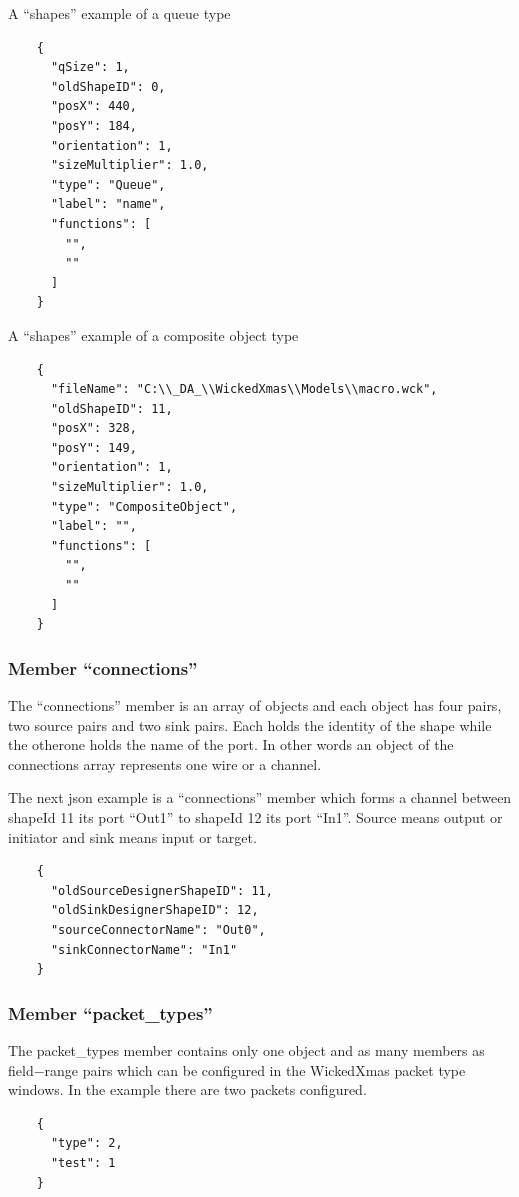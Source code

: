 \documentclass[a4paper,11pt,final]{article}
\begin{document}
\begin{samepage}
A ``shapes'' example of a queue type
\color{blue}
\begin{verbatim}
    {
      "qSize": 1,
      "oldShapeID": 0,
      "posX": 440,
      "posY": 184,
      "orientation": 1,
      "sizeMultiplier": 1.0,
      "type": "Queue",
      "label": "name",
      "functions": [
        "",
        ""
      ]
    }
\end{verbatim}
\color{black}
\end{samepage}

\begin{samepage}
A ``shapes'' example of a composite object type
\color{blue}
\begin{verbatim}
    {
      "fileName": "C:\\_DA_\\WickedXmas\\Models\\macro.wck",
      "oldShapeID": 11,
      "posX": 328,
      "posY": 149,
      "orientation": 1,
      "sizeMultiplier": 1.0,
      "type": "CompositeObject",
      "label": "",
      "functions": [
        "",
        ""
      ]
    }
\end{verbatim}
\color{black}
\end{samepage}

\begin{samepage}
\subsubsection{Member ``connections''}
The ``connections'' member is an array of objects and each object has four pairs, two
source pairs and two sink pairs. Each holds the identity of the shape while
the otherone holds the name of the port.
In other words an object of the connections array represents one wire or a channel.

The next json example is a ``connections'' member which forms a channel between shapeId 11 its port
``Out1'' to shapeId 12 its port ``In1''. Source means output or initiator and sink means
input or target.
\color{blue}
\begin{verbatim}
    {
      "oldSourceDesignerShapeID": 11,
      "oldSinkDesignerShapeID": 12,
      "sourceConnectorName": "Out0",
      "sinkConnectorName": "In1"
    }
    \end{verbatim}
\color{black}
\end{samepage}

\begin{samepage}
\subsubsection{Member ``packet\_types''}
The packet\_types member contains only one object and as many members as
field$-$range pairs which can be configured in the WickedXmas packet type windows.
In the example there are two packets configured.


\color{blue}
\begin{verbatim}
    {
      "type": 2,
      "test": 1
    }
\end{verbatim}
\color{black}
\end{samepage}
\end{document}
